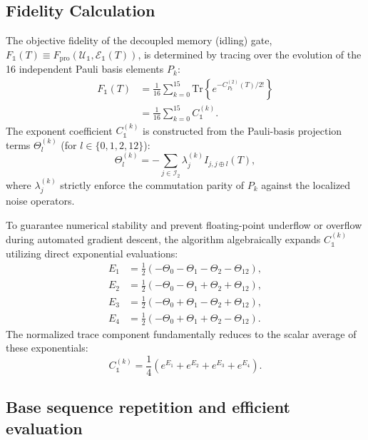 \documentclass[%
 reprint,
superscriptaddress,
 amsmath,amssymb,
 aps,
pra,
]{revtex4-2}
\newcommand{\qk}[1]{{\color{OliveGreen}#1}}
\begin{document}
\subsection{Fidelity Calculation}
The objective fidelity of the decoupled memory (idling) gate\qk{, $F_\mathbb{1}(T)\equiv F_{\text{pro}}(\mathcal{U}_\mathbb{1},\mathcal{E}_\mathbb{1}(T))$,} is determined by tracing over the evolution of the 16 independent Pauli basis elements $P_k$:
\begin{align}
    F_\mathbb{1}(T) &= \frac{1}{16} \sum_{k=0}^{15} \text{Tr} \left\{ e^{-C_{P_k}^{(2)}(T)/2!} \right\} \nonumber \\
    &= \frac{1}{16} \sum_{k=0}^{15} C_\mathbb{1}^{(k)}.
\end{align}
The exponent coefficient $C_\mathbb{1}^{(k)}$ is constructed from the Pauli-basis projection terms $\Theta_l^{(k)}$ (for $l \in \{0, 1, 2, 12\}$):
\begin{equation}
\Theta^{(k)}_l = -\sum_{j\in\mathcal{I}_2} \lambda^{(k)}_j I_{j,j\oplus l}(T),
\end{equation}
where $\lambda^{(k)}_j$ strictly enforce the commutation parity of $P_k$ against the localized noise operators. 

To guarantee numerical stability and prevent floating-point underflow or overflow during automated gradient descent, the algorithm algebraically expands $C_\mathbb{1}^{(k)}$ utilizing direct exponential evaluations:
\begin{align}
    E_1 &= \frac{1}{2}(-\Theta_0 - \Theta_1 - \Theta_2 - \Theta_{12}), \nonumber \\
    E_2 &= \frac{1}{2}(-\Theta_0 - \Theta_1 + \Theta_2 + \Theta_{12}), \nonumber \\
    E_3 &= \frac{1}{2}(-\Theta_0 + \Theta_1 - \Theta_2 + \Theta_{12}), \nonumber \\
    E_4 &= \frac{1}{2}(-\Theta_0 + \Theta_1 + \Theta_2 - \Theta_{12}).
\end{align}
The normalized trace component fundamentally reduces to the scalar average of these exponentials:
\begin{equation}
    C_\mathbb{1}^{(k)} = \frac{1}{4} \left( e^{E_1} + e^{E_2} + e^{E_3} + e^{E_4} \right).
\end{equation}

\subsection{Base sequence repetition and efficient evaluation}
\label{app::time_folding}
\end{document}
